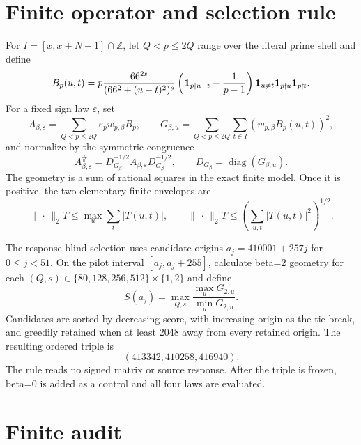 \documentclass[10pt]{article}
\newcommand{\opnorm}{\lVert\,\cdot\,\rVert_2}
\begin{document}
\section{Finite operator and selection rule}

For $I=[x,x+N-1]\cap\mathbb Z$, let $Q<p\leq 2Q$ range over the literal
prime shell and define
\begin{equation}
B_p(u,t)=p\frac{66^{2s}}{(66^2+(u-t)^2)^s}
\left({\bf1}_{p\mid u-t}-\frac1{p-1}\right)
{\mathbf 1}_{u\ne t}{\mathbf 1}_{p\nmid u}{\mathbf 1}_{p\nmid t}.
\label{eq:block}
\end{equation}
For a fixed sign law $\varepsilon$, set
\begin{equation}
A_{\beta,\varepsilon}=\sum_{Q<p\leq2Q}\varepsilon_p w_{p,\beta}B_p,
\qquad
G_{\beta,u}=\sum_{Q<p\leq2Q}\sum_{t\in I}
                 (w_{p,\beta}B_p(u,t))^2,
\label{eq:weighted}
\end{equation}
and normalize by the symmetric congruence
\begin{equation}
A_{\beta,\varepsilon}^{\#}=
D_{G_\beta}^{-1/2}A_{\beta,\varepsilon}D_{G_\beta}^{-1/2},
\qquad D_{G_\beta}=\operatorname{diag}(G_{\beta,u}).
\label{eq:norm}
\end{equation}
The geometry is a sum of rational squares in the exact finite model.  Once
it is positive, the two elementary finite envelopes are
\begin{equation}
\opnorm{T}\leq\max_u\sum_t|T(u,t)|,
\qquad
\opnorm{T}\leq\left(\sum_{u,t}|T(u,t)|^2\right)^{1/2}.
\label{eq:envelopes}
\end{equation}

The response-blind selection uses candidate origins
$a_j=410001+257j$ for $0\leq j<51$.  On the pilot interval
$[a_j,a_j+255]$, calculate beta=2 geometry for each
$(Q,s)\in\{80,128,256,512\}\times\{1,2\}$ and define
\begin{equation}
 S(a_j)=\max_{Q,s}\frac{\max_uG_{2,u}}{\min_uG_{2,u}}.
\label{eq:score}
\end{equation}
Candidates are sorted by decreasing score, with increasing origin as the
tie-break, and greedily retained when at least 2048 away from every retained
origin.  The resulting ordered triple is
\begin{equation}
 (413342,410258,416940).
\end{equation}
The rule reads no signed matrix or source response.  After the triple is
frozen, beta=0 is added as a control and all four laws are evaluated.

\section{Finite audit}
\end{document}

